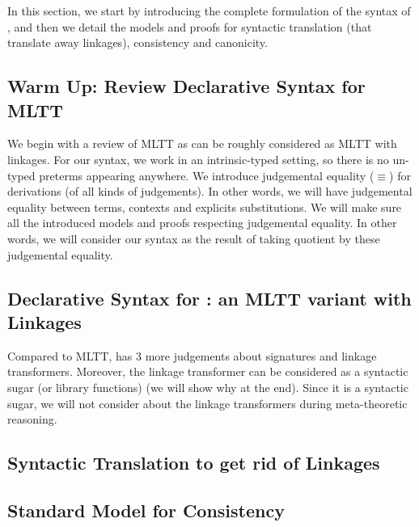 In this section, we start by introducing the complete formulation of the syntax of \TT, 
and then we detail the models and proofs for syntactic translation (that translate away linkages), 
consistency and canonicity. 

\subsection{Warm Up: Review Declarative Syntax for MLTT}
We begin with a review of MLTT as \TT can be roughly considered as MLTT with linkages.
For our syntax, we work in an intrinsic-typed setting, so there is no un-typed preterms appearing anywhere. We introduce judgemental equality ($\equiv$)
for derivations (of all kinds of judgements). In other words, we will have judgemental equality between terms, 
contexts and explicits substitutions. 
We will make sure all the introduced models and proofs respecting judgemental equality. In other words, we will consider our syntax as the result of taking quotient by these judgemental equality.



\subsection{Declarative Syntax for \TT : an MLTT variant with Linkages}
Compared to MLTT, \TT has 3 more judgements about signatures and linkage transformers. Moreover, the linkage transformer can be considered as a syntactic sugar (or library functions) (we will show why at the end). 
Since it is a syntactic sugar, we will not consider about the linkage transformers during meta-theoretic reasoning.









\subsection{Syntactic Translation to get rid of Linkages}



\subsection{Standard Model for Consistency}

